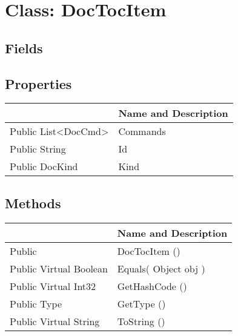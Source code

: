 \documentclass[11pt, oneside, a4paper]{book}
\begin{document}
\hypertarget{SoftwareEngineeringTools.{}Documentation.{}DocTocItem}{}
\section{Class: DocTocItem}

\subsection{Fields}

\subsection{Properties}
\begin{center}
\begin{tabular}{| p{3cm} | p{12cm} | }
\hline
\textbf{ } & \textbf{ Name and Description}\\
\hline
 Public  List<DocCmd> &  Commands\hypertarget{SoftwareEngineeringTools.{}Documentation.{}DocTocItem.{}Commands}{}\\
\hline
 Public  String &  Id\hypertarget{SoftwareEngineeringTools.{}Documentation.{}DocTocItem.{}Id}{}\\
\hline
 Public  DocKind &  Kind\hypertarget{SoftwareEngineeringTools.{}Documentation.{}DocTocItem.{}Kind}{}\\
\hline
\end{tabular}
\end{center}

\subsection{Methods}
\begin{center}
\begin{tabular}{| p{3cm} | p{12cm} | }
\hline
\textbf{ } & \textbf{ Name and Description}\\
\hline
 Public  &  DocTocItem ()\hypertarget{SoftwareEngineeringTools.{}Documentation.{}DocTocItem.{}DocTocItem}{}\\
\hline
 Public  Virtual  Boolean &  Equals(\hypertarget{SoftwareEngineeringTools.{}Documentation.{}DocTocItem.{}Equals\_Object}{} Object  obj  )\\
\hline
 Public  Virtual  Int32 &  GetHashCode ()\hypertarget{SoftwareEngineeringTools.{}Documentation.{}DocTocItem.{}GetHashCode}{}\\
\hline
 Public  Type &  GetType ()\hypertarget{SoftwareEngineeringTools.{}Documentation.{}DocTocItem.{}GetType}{}\\
\hline
 Public  Virtual  String &  ToString ()\hypertarget{SoftwareEngineeringTools.{}Documentation.{}DocTocItem.{}ToString}{}\\
\hline
\end{tabular}
\end{center}
 
\end{document}
